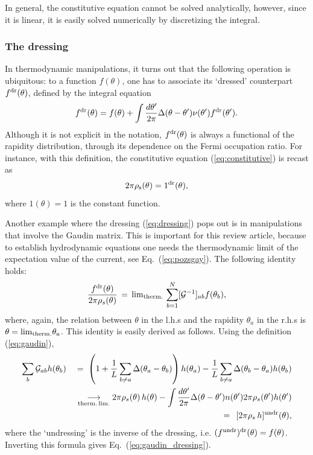 \documentclass[onecolumn,amsfonts,showpacs,superscriptaddress]{revtex4-1}
\begin{document}
In general, the constitutive equation cannot be solved analytically, however, since it is linear, it is easily solved numerically by discretizing the integral.


\subsubsection{The dressing}


In thermodynamic manipulations, it turns out that the following operation is ubiquitous: to a function $f(\theta)$, one has to associate its `dressed' counterpart $f^{\rm dr} (\theta)$, defined by the integral equation
\begin{equation}
    \label{eq:dressing}
	 f^{\rm dr} (\theta) = f(\theta) + \int \frac{d\theta'}{2\pi} \Delta(\theta-\theta') \nu(\theta') f^{\rm dr}(\theta')  .
\end{equation}
Although it is not explicit in the notation, $f^{\rm dr} (\theta)$ is always a functional of the rapidity distribution, through its dependence on the Fermi occupation ratio. For instance, with this definition, the constitutive equation (\ref{eq:constitutive}) is recast as
\begin{equation}
    2\pi \rho_{\rm s}(\theta) = 1^{\rm dr} (\theta),
\end{equation}
where $1 (\theta) = 1$ is the constant function.

Another example where the dressing (\ref{eq:dressing}) pops out is in manipulations that involve the Gaudin matrix. This is important for this review article, because to establish hydrodynamic equations one needs the thermodynamic limit of the expectation value of the current, see Eq.~(\ref{eq:pozsgay}). The following identity holds:
\begin{equation}
    \label{eq:gaudin_dressing}
	\frac{f^{\rm dr} (\theta)}{2\pi \rho_s(\theta)} \, = \,    {\rm lim}_{\rm therm.} \, \sum_{b=1}^N [\mathcal{G}^{-1}]_{ab} f(\theta_b) ,
\end{equation}
where, again, the relation between $\theta$ in the l.h.s and the rapidity $\theta_a$ in the r.h.s is $\theta = {\rm lim}_{\rm therm.} \theta_a$. This identity is easily derived as follows. Using the definition (\ref{eq:gaudin}), 
\begin{eqnarray}
\nonumber	\sum_b \mathcal{G}_{ab} h (\theta_b) && \; = \;  \left( 1 + \frac{1}{L} \sum_{b \neq a} \Delta(\theta_a - \theta_b)  \right)  h(\theta_a) -  \frac{1}{L} \sum_{b \neq a} \Delta ( \theta_b - \theta_a ) h(\theta_b) \\
\nonumber	&& \underset{{\rm therm. \,lim.}}{\longrightarrow} 2\pi \rho_s(\theta) \, h (\theta)  -  \int \frac{d\theta'}{2\pi} \Delta ( \theta - \theta' ) n(\theta')  2\pi \rho_s(\theta')  h(\theta') \\
&& \; = \; \, [2\pi \rho_s \, h ]^{\rm undr} (\theta) ,
\end{eqnarray}
where the `undressing' is the inverse of the dressing, i.e. $(f^{{\rm undr }})^{{\rm dr}} (\theta) = f(\theta)$. Inverting this formula gives Eq.~(\ref{eq:gaudin_dressing}).
\end{document}
